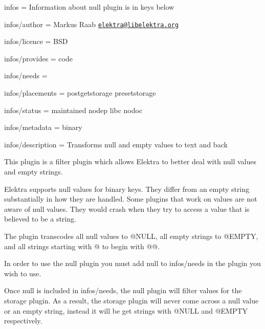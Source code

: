 
\begin{DoxyItemize}
\item infos = Information about null plugin is in keys below
\item infos/author = Markus Raab \href{mailto:elektra@libelektra.org}{\tt elektra@libelektra.\+org}
\item infos/licence = B\+SD
\item infos/provides = code
\item infos/needs =
\item infos/placements = postgetstorage presetstorage
\item infos/status = maintained nodep libc nodoc
\item infos/metadata = binary
\item infos/description = Transforms null and empty values to text and back
\end{DoxyItemize}

This plugin is a filter plugin which allows Elektra to better deal with null values and empty strings.

Elektra supports null values for binary keys. They differ from an empty string substantially in how they are handled. Some plugins that work on values are not aware of null values. They would crash when they try to access a value that is believed to be a string.

The plugin transcodes all null values to {\ttfamily @N\+U\+LL}, all empty strings to {\ttfamily @E\+M\+P\+TY}, and all strings starting with {\ttfamily @} to begin with {\ttfamily @@}.

In order to use the {\ttfamily null} plugin you must add {\ttfamily null} to {\ttfamily infos/needs} in the plugin you wish to use.

Once {\ttfamily null} is included in {\ttfamily infos/needs}, the null plugin will filter values for the storage plugin. As a result, the storage plugin will never come across a null value or an empty string, instead it will be get strings with {\ttfamily @N\+U\+LL} and {\ttfamily @E\+M\+P\+TY} respectively. 
